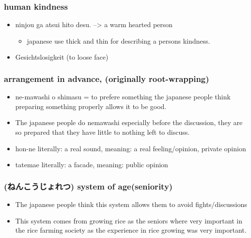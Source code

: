 \documentclass{article}
\newcommand\tabni[1][0.2cm]{\hspace*{#1}}
\begin{document}
\subsubsection{ \tabni human kindness}
\begin{itemize}%
\item ninjou ga atsui hito desu. --> a warm hearted person
\begin{itemize}%
\item japanese use thick and thin for describing a persons kindness.
\end{itemize}
\item {} Gesichtslosigkeit (to loose face)\\ %
\end{itemize}
\subsubsection{ \tabni arrangement in advance, (originally root-wrapping)}
\begin{itemize}%
\item ne-mawashi o shimasu = to prefere something the japanese people think preparing something properly allows it to be good. 
\item The japanese people do nemawashi especially before the discussion, they are so prepared that they have little to nothing left to discuss.
\end{itemize}
\begin{itemize}%
\item hon-ne literally: a real sound, meaning: a real feeling/opinion, private opinion
\item tatemae literally: a facade, meaning: public opinion \\
\end{itemize}
\subsubsection{ (ねんこうじょれつ) \tabni system of age(seniority)}
\begin{itemize}%
\item The japanese people think this system allows them to avoid fights/discussions 
\item This system comes from growing rice as the seniors where very important in the rice farming society as the experience in rice growing was very important. \\
\end{itemize}
\end{document}
